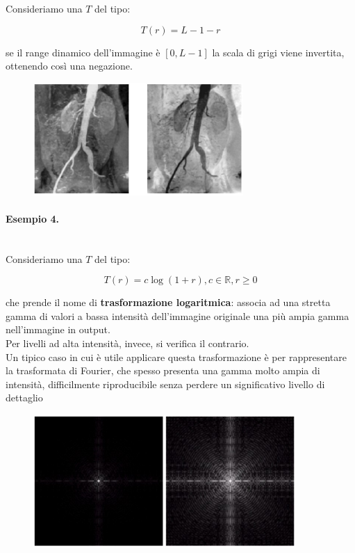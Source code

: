 Consideriamo una $T$ del tipo:

$$
    T(r) = L - 1 - r
$$

se il range dinamico dell'immagine è $[0, L - 1]$
la scala di grigi viene invertita, ottenendo così una negazione.

\begin{figure}[H]
    \centering
    \includegraphics[width=8cm, keepaspectratio]{capitoli/immagini/imgs/angiografie_esempio_3.jpg}
\end{figure}

\paragraph{Esempio 4.}\ \\

Consideriamo una $T$ del tipo:

$$
    T(r) = c \log(1 + r), c \in  \mathbb{R}, r \geq 0
$$

che prende il nome di \textbf{trasformazione logaritmica}: associa ad una
stretta gamma di valori a bassa intensità dell'immagine originale
una più ampia gamma nell'immagine in output.\\
Per livelli ad alta intensità, invece, si verifica il contrario.\\
Un tipico caso in cui è utile applicare questa trasformazione è per
rappresentare la trasformata di Fourier, che spesso presenta una
gamma molto ampia di intensità, difficilmente riproducibile senza
perdere un significativo livello di dettaglio

\begin{figure}[H]
    \centering
    \includegraphics[width=10cm, keepaspectratio]{capitoli/immagini/imgs/trasformazione_logaritmica_esempio_4.jpg}
\end{figure}

